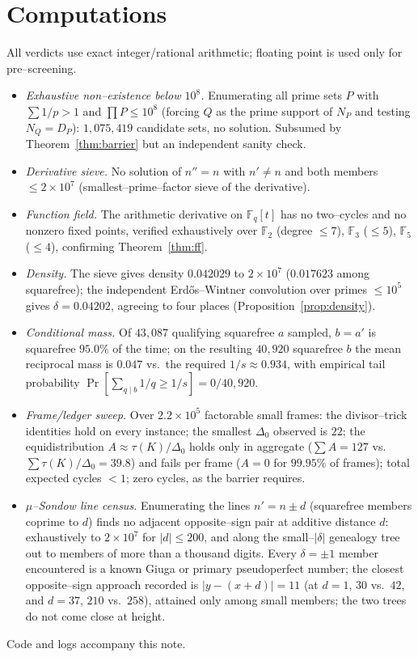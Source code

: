 \documentclass[11pt]{article}
\theoremstyle{definition}
\begin{document}
\section{Computations}\label{sec:computations}

All verdicts use exact integer/rational arithmetic; floating point is used only for pre--screening.
\begin{itemize}[leftmargin=1.4em]
\item \emph{Exhaustive non--existence below $10^8$.} Enumerating all prime sets $P$ with
$\sum1/p>1$ and $\prod P\le10^8$ (forcing $Q$ as the prime support of $N_P$ and testing
$N_Q=D_P$): $1{,}075{,}419$ candidate sets, no solution. Subsumed by Theorem~\ref{thm:barrier} but an
independent sanity check.
\item \emph{Derivative sieve.} No solution of $n''=n$ with $n'\ne n$ and both members $\le
2\times10^7$ (smallest--prime--factor sieve of the derivative).
\item \emph{Function field.} The arithmetic derivative on $\mathbb{F}_q[t]$ has no two--cycles and no
nonzero fixed points, verified exhaustively over $\mathbb{F}_2$ (degree $\le7$), $\mathbb{F}_3$
($\le5$), $\mathbb{F}_5$ ($\le4$), confirming Theorem~\ref{thm:ff}.
\item \emph{Density.} The sieve gives density $0.042029$ to $2\times10^7$ ($0.017623$ among
squarefree); the independent Erd\H{o}s--Wintner convolution over primes $\le10^5$ gives
$\delta=0.04202$, agreeing to four places (Proposition~\ref{prop:density}).
\item \emph{Conditional mass.} Of $43{,}087$ qualifying squarefree $a$ sampled, $b=a'$ is squarefree
$95.0\%$ of the time; on the resulting $40{,}920$ squarefree $b$ the mean reciprocal mass is $0.047$
vs.\ the required $1/s\approx0.934$, with empirical tail probability $\Pr[\sum_{q\mid b}1/q\ge1/s]=
0/40{,}920$.
\item \emph{Frame/ledger sweep.} Over $2.2\times10^5$ factorable small frames: the divisor--trick
identities hold on every instance; the smallest $\Delta_0$ observed is $22$; the equidistribution
$A\approx\tau(K)/\Delta_0$ holds only in aggregate ($\sum A=127$ vs.\ $\sum\tau(K)/\Delta_0=39.8$)
and fails per frame ($A=0$ for $99.95\%$ of frames); total expected cycles $<1$; zero cycles, as the
barrier requires.
\item \emph{$\mu$--Sondow line census.} Enumerating the lines $n'=n\pm d$ (squarefree members coprime to
$d$) finds no adjacent opposite--sign pair at additive distance $d$: exhaustively to $2\times10^7$ for
$|d|\le200$, and along the small--$|\delta|$ genealogy tree out to members of more than a thousand digits.
Every $\delta=\pm1$ member encountered is a known Giuga or primary pseudoperfect number; the closest
opposite--sign approach recorded is $|y-(x+d)|=11$ (at $d=1$, $30$ vs.\ $42$, and $d=37$, $210$ vs.\ $258$),
attained only among small members; the two trees do not come close at height.
\end{itemize}
Code and logs accompany this note.
\end{document}
